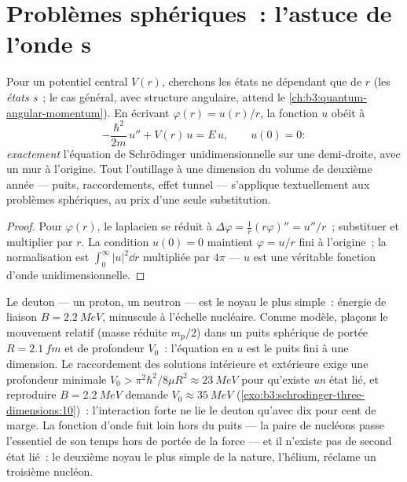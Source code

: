 \section{Problèmes sphériques~: l'astuce de l'onde s}

\begin{proposition}\label{prop:b3:schrodinger-three-dimensions:swave}
Pour un potentiel central $V(r)$, cherchons les états ne dépendant que
de $r$ (les \emph{états s}~; le cas général, avec structure angulaire,
attend le \cref{ch:b3:quantum-angular-momentum}). En écrivant
$\varphi(r) = u(r)/r$, la fonction $u$ obéit à
\[
-\frac{\hbar^2}{2m}\,u'' + V(r)\,u = E\,u ,
\qquad u(0) = 0 :
\]
\emph{exactement} l'équation de Schrödinger unidimensionnelle sur une
demi-droite, avec un mur à l'origine. Tout l'outillage à une dimension
du volume de deuxième année --- puits, raccordements, effet tunnel ---
s'applique textuellement aux problèmes sphériques, au prix d'une seule
substitution.
\end{proposition}

\begin{proof}
Pour $\varphi(r)$, le laplacien se réduit à $\Delta\varphi =
\tfrac1r(r\varphi)'' = u''/r$~; substituer et multiplier par $r$. La
condition $u(0) = 0$ maintient $\varphi = u/r$ fini à l'origine~; la
normalisation est $\int_0^\infty|u|^2\dd r$ multipliée par $4\pi$ ---
$u$ est une véritable fonction d'onde unidimensionnelle.
\end{proof}

\begin{example}\label{ex:b3:schrodinger-three-dimensions:deuteron}
Le deuton --- un proton, un neutron --- est le noyau le plus simple~:
énergie de liaison $B = \qty{2.2}{MeV}$, minuscule à l'échelle
nucléaire. Comme modèle, plaçons le mouvement relatif (masse réduite
$m_{\text{p}}/2$) dans un puits sphérique de portée $R = \qty{2.1}{fm}$
et de profondeur $V_0$~: l'équation en $u$ est le puits fini à une
dimension. Le raccordement des solutions intérieure et extérieure exige
une profondeur minimale $V_0 > \pi^2\hbar^2/8\mu R^2
\approx \qty{23}{MeV}$ pour qu'existe \emph{un} état lié, et
reproduire $B = \qty{2.2}{MeV}$ demande $V_0 \approx \qty{35}{MeV}$
(\cref{exo:b3:schrodinger-three-dimensions:10})~: l'interaction forte
ne lie le deuton qu'avec dix pour cent de marge. La fonction d'onde
fuit loin hors du puits --- la paire de nucléons passe l'essentiel de
son temps hors de portée de la force --- et il n'existe pas de second
état lié~: le deuxième noyau le plus simple de la nature, l'hélium,
réclame un troisième nucléon.
\end{example}

